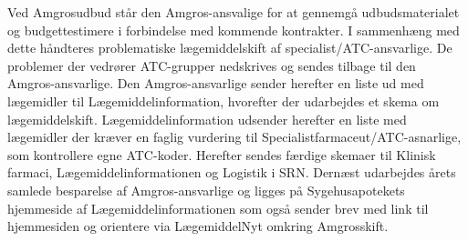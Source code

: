 Ved Amgrosudbud står den Amgros-ansvalige  for at gennemgå udbudsmaterialet og budgettestimere i forbindelse med kommende kontrakter. I sammenhæng med dette håndteres problematiske lægemiddelskift af specialist/ATC-ansvarlige. De problemer der vedrører ATC-grupper nedskrives og sendes tilbage til den Amgros-ansvarlige. Den Amgros-ansvarlige sender herefter en liste ud med lægemidler til Lægemiddelinformation, hvorefter der udarbejdes et skema om lægemiddelskift. Lægemiddelinformation udsender herefter en liste med lægemidler der kræver en faglig vurdering til Specialistfarmaceut/ATC-asnarlige, som kontrollere egne ATC-koder. Herefter sendes færdige skemaer til Klinisk farmaci, Lægemiddelinformationen og Logistik i SRN. Dernæst udarbejdes årets samlede besparelse af Amgros-ansvarlige og ligges på Sygehusapotekets hjemmeside af Lægemiddelinformationen som også sender brev med link til hjemmesiden og orientere via LægemiddelNyt omkring Amgrosskift. 